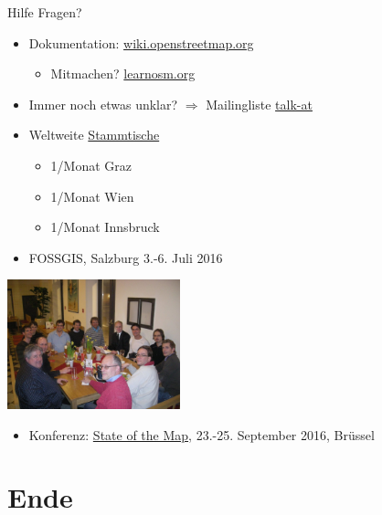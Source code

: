 \documentclass{beamer}
\begin{document}
\begin{frame}{Hilfe}
Fragen? 
\begin{itemize}
  \item Dokumentation: \href{http://wiki.openstreetmap.org}{wiki.openstreetmap.org}
  \begin{itemize} 
    \item Mitmachen? \href{http://learnosm.org/}{learnosm.org}
  \end{itemize}
  \item Immer noch etwas unklar? $\Rightarrow$ Mailingliste \href{http://lists.openstreetmap.org/listinfo/talk-at}{talk-at}
 \vspace*{0.4cm}
  \item Weltweite \href{http://usergroups.openstreetmap.de/}{Stammtische}
  \begin{itemize}
    \item 1/Monat Graz
    \item 1/Monat Wien
    \item 1/Monat Innsbruck
  \end{itemize}
 \vspace*{0.4cm}
  \item FOSSGIS, Salzburg 3.-6. Juli 2016

\end{itemize}

 \vspace*{-2.8cm}
\hfill\includegraphics[width=5cm]{Salzburg_stammtisch.jpg}

\begin{itemize}
  \item Konferenz: \href{http://stateofthemap.org/}{State of the Map}, 23.-25. September 2016, Brüssel
\end{itemize}
\end{frame}

\section{Ende}
\end{document}
